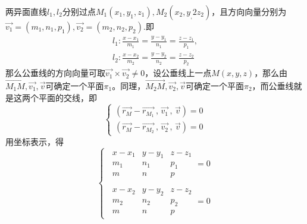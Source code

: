 \theorem[两直线的公垂线]
\quad 两异面直线$l_1,l_2$分别过点$M_1(x_1,y_1,z_1),M_2(x_2,y_,2z_2)$，且方向向量分别为$\overrightarrow{v_1}=(m_1,n_1,p_1),\overrightarrow{v_2}=(m_2,n_2,p_2)$.即
\begin{equation*}
\begin{array}{c}
\displaystyle l_1:\frac{x-x_1}{m_1}=\frac{y-y_1}{n_1}=\frac{z-z_1}{p_1},\\
\displaystyle l_2:\frac{x-x_2}{m_2}=\frac{y-y_2}{n_2}=\frac{z-z_2}{p_2}
\end{array}
\end{equation*}
\qquad 那么公垂线的方向向量可取$\overrightarrow{v_1} \times \overrightarrow{v_2} \neq 0$，设公垂线上一点$M(x,y,z)$，那么由$\overrightarrow{M_1M},\overrightarrow{v_1},\overrightarrow{v}$可确定一个平面$\pi_1$。同理，$\overrightarrow{M_2M},\overrightarrow{v_2},\overrightarrow{v}$可确定一个平面$\pi_2$，而公垂线就是这两个平面的交线，即
\begin{equation}
\begin{cases}
\left( \overrightarrow{r_M}-\overrightarrow{r_{M_1}}\,,\,\overrightarrow{v_1}\,,\,\overrightarrow{v}\right) =0\\
\left( \overrightarrow{r_M}-\overrightarrow{r_{M_2}}\,,\,\overrightarrow{v_2}\,,\,\overrightarrow{v}\right) =0
\end{cases}
\end{equation}
用坐标表示，得
\begin{equation}
\begin{cases}
\,
\begin{array}{|ccc|}
x-x_1 &y-y_1  &z-z_1  \\ 
m_1&n_1  &p_1  \\ 
m&n  &p 
\end{array}=0\\ 
\quad \\
\,
\begin{array}{|ccc|}
x-x_2 &y-y_2  &z-z_2  \\ 
m_2&n_2  &p_2  \\ 
m&n  &p 
\end{array}=0
\end{cases}
\end{equation}


